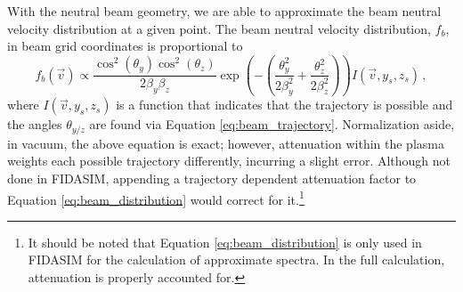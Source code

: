 With the neutral beam geometry, we are able to approximate the beam neutral velocity distribution at a given point. The beam neutral velocity distribution, $f_b$, in beam grid coordinates is proportional to
\begin{equation}\label{eq:beam_distribution}
    f_b(\vec{v}) \propto \frac{\cos^2(\theta_y)\cos^2(\theta_z)}{2\beta_y\beta_z}\exp\left(-\left(\frac{\theta_y^2}{2\beta_y^2} + \frac{\theta_z^2}{2\beta_z^2}\right)\right)I(\vec{v},y_s,z_s)\,,
\end{equation}
where $I(\vec{v},y_s,z_s)$ is a function that indicates that the trajectory is possible and the angles $\theta_{y/z}$ are found via Equation \ref{eq:beam_trajectory}. Normalization aside, in vacuum, the above equation is exact; however, attenuation within the plasma weights each possible trajectory differently, incurring a slight error. Although not done in FIDASIM, appending a trajectory dependent attenuation factor to Equation \ref{eq:beam_distribution} would correct for it.\footnote{It should be noted that Equation \ref{eq:beam_distribution} is only used in FIDASIM for the calculation of approximate spectra. In the full calculation, attenuation is properly accounted for.}

